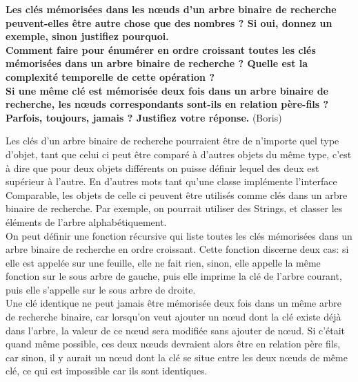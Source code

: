 \textbf{Les clés mémorisées dans les nœuds d'un arbre binaire de recherche peuvent-elles être autre chose que des nombres ? Si oui, donnez un exemple, sinon justifiez pourquoi. \\
Comment faire pour énumérer en ordre croissant toutes les clés mémorisées dans un arbre binaire de recherche ? Quelle est la complexité temporelle de cette opération ? \\
Si une même clé est mémorisée deux fois dans un arbre binaire de recherche, les nœuds correspondants sont-ils en relation père-fils ? Parfois, toujours, jamais ? Justifiez votre réponse.} (Boris)

Les clés d'un arbre binaire de recherche pourraient être de n'importe quel type d'objet, tant que celui ci peut être comparé à d'autres objets du même type, c'est à dire que pour deux objets différents on puisse définir lequel des deux est supérieur à l'autre. En d'autres mots tant qu'une classe implémente l'interface Comparable, les objets de celle ci peuvent être utilisés comme clés dans un arbre binaire de recherche. Par exemple, on pourrait utiliser des Strings, et classer les éléments de l'arbre alphabétiquement.\\
On peut définir une fonction récursive qui liste toutes les clés mémorisées dans un arbre binaire de recherche en ordre croissant. Cette fonction discerne deux cas: si elle est appelée sur une feuille, elle ne fait rien, sinon, elle appelle la même fonction sur le sous arbre de gauche, puis elle imprime la clé de l'arbre courant, puis elle s'appelle sur le sous arbre de droite.\\
Une clé identique ne peut jamais être mémorisée deux fois dans un même arbre de recherche binaire, car lorsqu'on veut ajouter un nœud dont la clé existe déjà dans l'arbre, la valeur de ce nœud sera modifiée sans ajouter de nœud. Si c'était quand même possible, ces deux nœuds devraient alors être en relation père fils, car sinon, il y aurait un nœud dont la clé se situe entre les deux nœuds de même  clé, ce qui est impossible car ils sont identiques.
